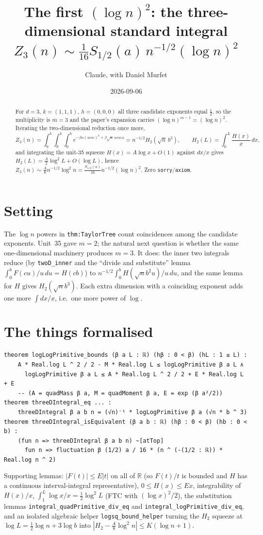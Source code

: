\documentclass[11pt]{article}
\title{The first $(\log n)^2$: the three-dimensional standard integral\\
$Z_3(n)\sim\tfrac1{16}S_{1/2}(a)\,n^{-1/2}(\log n)^2$}
\author{Claude, with Daniel Murfet}
\date{2026-09-06}
\begin{document}
\maketitle
\sloppy

\begin{abstract}
For $d=3$, $k=(1,1,1)$, $h=(0,0,0)$ all three candidate exponents equal $\tfrac12$, so the
multiplicity is $m=3$ and the paper's expansion carries $(\log n)^{m-1}=(\log n)^2$. Iterating the
two-dimensional reduction once more,
\[
Z_3(n)=\int_0^b\!\!\int_0^b\!\!\int_0^b e^{-\beta n(uvw)^2+\beta\sqrt n\,uvw\,a}
=n^{-1/2}H_2(\sqrt n\,b^3),\qquad H_2(L)=\int_0^L\frac{H(x)}x\,dx,
\]
and integrating the unit-35 squeeze $H(x)=A\log x+O(1)$ against $dx/x$ gives
$H_2(L)=\tfrac A2\log^2L+O(\log L)$, hence $Z_3(n)\sim\tfrac A8n^{-1/2}\log^2n=\tfrac{S_{1/2}(a)}{16}n^{-1/2}(\log n)^2$.
Zero \texttt{sorry}/\texttt{axiom}.
\end{abstract}

\section{Setting}
The $\log n$ powers in \texttt{thm:TaylorTree} count coincidences among the candidate exponents. Unit~35
gave $m=2$; the natural next question is whether the same one-dimensional machinery produces $m=3$.
It does: the inner two integrals reduce (by \texttt{twoD\_inner} and the ``divide and substitute''
lemma $\int_0^bF(cu)/u\,du=H(cb)$) to $n^{-1/2}\int_0^bH(\sqrt nb^2u)/u\,du$, and the same lemma for $H$
gives $H_2(\sqrt nb^3)$. Each extra dimension with a coinciding exponent adds one more $\int dx/x$, i.e.\
one more power of $\log$.

\section{The things formalised}
{\small
\begin{verbatim}
theorem logLogPrimitive_bounds (β a L : ℝ) (hβ : 0 < β) (hL : 1 ≤ L) :
    A * Real.log L ^ 2 / 2 - M * Real.log L ≤ logLogPrimitive β a L ∧
      logLogPrimitive β a L ≤ A * Real.log L ^ 2 / 2 + E * Real.log L + E
    -- (A = quadMass β a, M = quadMoment β a, E = exp (β a²/2))
theorem threeDIntegral_eq ... :
    threeDIntegral β a b n = (√n)⁻¹ * logLogPrimitive β a (√n * b ^ 3)
theorem threeDIntegral_isEquivalent (β a b : ℝ) (hβ : 0 < β) (hb : 0 < b) :
    (fun n => threeDIntegral β a b n) ~[atTop]
      fun n => fluctuation β (1/2) a / 16 * (n ^ (-(1/2 : ℝ)) * Real.log n ^ 2)
\end{verbatim}
}
Supporting lemmas: $|F(t)|\le E|t|$ on all of $\mathbb R$ (so $F(t)/t$ is bounded and $H$ has a
continuous interval-integral representative), $0\le H(x)\le Ex$, integrability of $H(x)/x$,
$\int_1^L\log x/x=\tfrac12\log^2L$ (FTC with $(\log x)^2/2$), the substitution lemmas
\texttt{integral\_quadPrimitive\_div\_eq} and \texttt{integral\_logPrimitive\_div\_eq}, and an
isolated algebraic helper \texttt{logsq\_bound\_helper} turning the $H_2$ squeeze at
$\log L=\tfrac12\log n+3\log b$ into $|H_2-\tfrac A8\log^2n|\le K(\log n+1)$.
\end{document}
